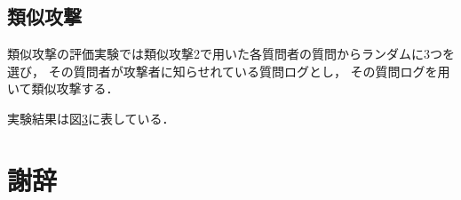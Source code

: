 \documentclass[master]{suribt}
\theoremstyle{definition}
\begin{document}
 \section{類似攻撃}
 類似攻撃の評価実験では類似攻撃2で用いた各質問者の質問からランダムに3つを選び，
 その質問者が攻撃者に知らせれている質問ログとし，
 その質問ログを用いて類似攻撃する．
 
 実験結果は図\ref{}に表している．

 \backmatter%
 \chapter{謝辞}%


  \appendix%
  \chapter{}
  
\end{document}
